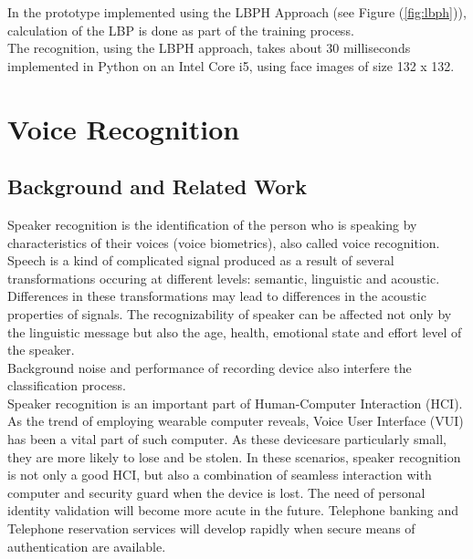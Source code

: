In the prototype implemented using the LBPH Approach (see Figure (\ref{fig:lbph})), calculation of the
LBP is done as part of the training process. \\
The recognition, using the LBPH approach, takes about 30 milliseconds
implemented in Python on an Intel Core i5, using face images of size 132 x 132. \\

\section{Voice Recognition}

\subsection{Background and Related Work}
Speaker recognition is the identification of the person who is speaking by
characteristics of their voices (voice biometrics), also called voice recognition. \\
Speech is a kind of complicated signal produced as a result of several transformations
occuring at different levels: semantic, linguistic and acoustic. Differences in these transformations may lead to differences in the acoustic properties of signals. The recognizability of speaker can be affected not only by the linguistic message but also the age, health, emotional state and effort level of the speaker. \\
Background noise and performance of recording device also interfere the classification process. \\
Speaker recognition is an important part of Human-Computer Interaction (HCI). As the trend of employing wearable computer reveals, Voice User Interface (VUI) has been a vital part of such computer. As these devicesare particularly small, they are more likely to lose and be stolen. In these scenarios, speaker recognition is not only a good HCI, but also a combination of seamless interaction with computer and security guard when the device is lost. The need of personal identity validation will become more acute in the future. Telephone banking and Telephone reservation services will develop rapidly when secure means of authentication are available. \\

